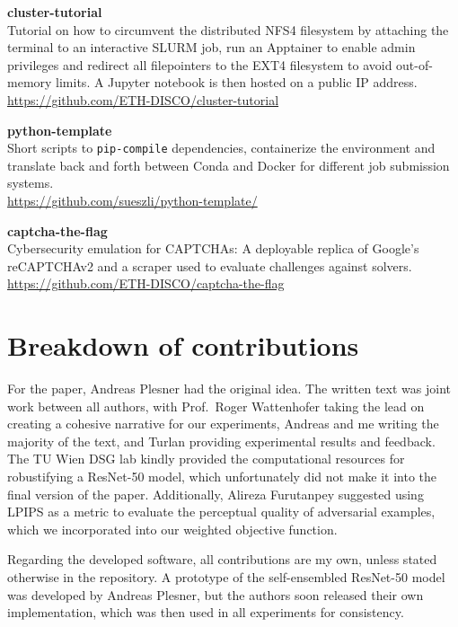 \documentclass[a4paper, oneside]{discothesis}
\newcommand{\linebreaks}{\vspace*{0.5em}}
\begin{document}
\linebreaks

\textbf{cluster-tutorial} \\
Tutorial on how to circumvent the distributed NFS4 filesystem by attaching the terminal to an interactive SLURM job, run an Apptainer to enable admin privileges and redirect all filepointers to the EXT4 filesystem to avoid out-of-memory limits. A Jupyter notebook is then hosted on a public IP address. \\
\url{https://github.com/ETH-DISCO/cluster-tutorial}

\linebreaks

\textbf{python-template} \\
Short scripts to \texttt{pip-compile} dependencies, containerize the environment and translate back and forth between Conda and Docker for different job submission systems. \\
\url{https://github.com/sueszli/python-template/}

\linebreaks

\textbf{captcha-the-flag} \\
Cybersecurity emulation for CAPTCHAs: A deployable replica of Google's reCAPTCHAv2 and a scraper used to evaluate challenges against solvers. \\
\url{https://github.com/ETH-DISCO/captcha-the-flag}

\section*{Breakdown of contributions}

For the paper, Andreas Plesner had the original idea. The written text was joint work between all authors, with Prof.\ Roger Wattenhofer taking the lead on creating a cohesive narrative for our experiments, Andreas and me writing the majority of the text, and Turlan providing experimental results and feedback. The TU Wien DSG lab kindly provided the computational resources for robustifying a ResNet-50 model, which unfortunately did not make it into the final version of the paper. Additionally, Alireza Furutanpey suggested using LPIPS as a metric to evaluate the perceptual quality of adversarial examples, which we incorporated into our weighted objective function.

Regarding the developed software, all contributions are my own, unless stated otherwise in the repository. A prototype of the self-ensembled ResNet-50 model was developed by Andreas Plesner, but the authors soon released their own implementation, which was then used in all experiments for consistency.
\end{document}
